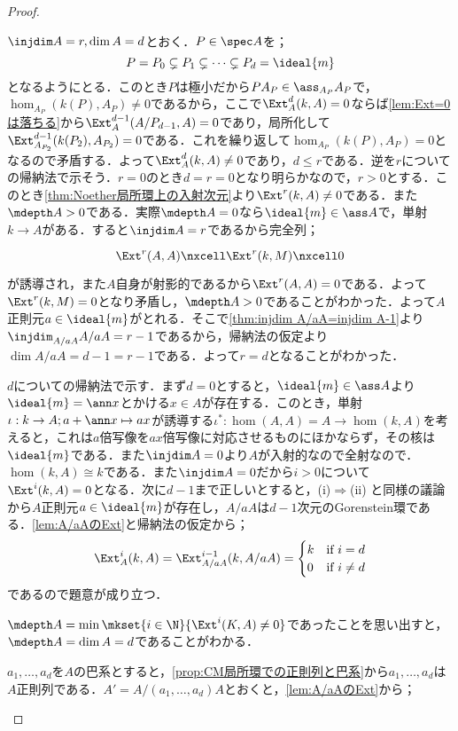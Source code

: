 \begin{proof}
	\begin{eqv}[7]
		\item 
		$\injdim A=r,\dim A=d$とおく．$P\in\spec A$を；
		\[P=P_0\subsetneq P_1\subsetneq\dots\subsetneq P_d=\ideal{m}\]
		となるようにとる．このとき$P$は極小だから$PA_P\in\ass_{A_P}A_P$で，$\hom_{A_P}(k(P),A_P)\neq0$であるから，ここで$\Ext^d_A(k,A)=0$ならば\ref{lem:Ext=0は落ちる}から$\Ext^{d-1}_A(A/P_{d-1},A)=0$であり，局所化して$\Ext^{d-1}_{A_{P_2}}(k(P_2),A_{P_2})=0$である．これを繰り返して$\hom_{A_P}(k(P),A_P)=0$となるので矛盾する．よって$\Ext^d_A(k,A)\neq0$であり，$d\leq r$である．逆を$r$についての帰納法で示そう．$r=0$のとき$d=r=0$となり明らかなので，$r>0$とする．このとき\ref{thm:Noether局所環上の入射次元}より$\Ext^r(k,A)\neq0$である．また$\mdepth A>0$である．実際$\mdepth A=0$なら$\ideal{m}\in\ass A$で，単射$k\to A$がある．すると$\injdim A=r$であるから完全列；
		\[\begin{tikzcd}
		\Ext^r(A,A)\nxcell\Ext^r(k,M)\nxcell0
		\end{tikzcd}\]
		が誘導され，また$A$自身が射影的であるから$\Ext^r(A,A)=0$である．よって$\Ext^r(k,M)=0$となり矛盾し，$\mdepth A>0$であることがわかった．よって$A$正則元$a\in\ideal{m}$がとれる．そこで\ref{thm:injdim A/aA=injdim A-1}より$\injdim_{A/aA}A/aA=r-1$であるから，帰納法の仮定より$\dim A/aA=d-1=r-1$である．よって$r=d$となることがわかった．
		\item $d$についての帰納法で示す．まず$d=0$とすると，$\ideal{m}\in\ass A$より$\ideal{m}=\ann x$とかける$x\in A$が存在する．このとき，単射$\iota:k\to A;a+\ann x\mapsto ax$が誘導する$\iota^\ast:\hom(A,A)=A\to\hom(k,A)$を考えると，これは$a$倍写像を$ax$倍写像に対応させるものにほかならず，その核は$\ideal{m}$である．また$\injdim A=0$より$A$が入射的なので全射なので．$\hom(k,A)\cong k$である．また$\injdim A=0$だから$i>0$について$\Ext^i(k,A)=0$となる．次に$d-1$まで正しいとすると，(i)$\Longrightarrow$(ii) と同様の議論から$A$正則元$a\in\ideal{m}$が存在し，$A/aA$は$d-1$次元のGorenstein環である．\ref{lem:A/aAのExt}と帰納法の仮定から；
		\[\Ext^i_A(k,A)=\Ext^{i-1}_{A/aA}(k,A/aA)=\begin{cases}
		k&\text{if}~i=d\\0&\text{if}~i\neq d
		\end{cases}\]
		であるので題意が成り立つ．
		\item $\mdepth A=\min\mkset{i\in\N}{\Ext^i(K,A)\neq0}$であったことを思い出すと，$\mdepth A=\dim A=d$であることがわかる．
		\item $a_1,\dots,a_d$を$A$の巴系とすると，\ref{prop:CM局所環での正則列と巴系}から$a_1,\dots,a_d$は$A$正則列である．$A'=A/(a_1,\dots,a_d)A$とおくと，\ref{lem:A/aAのExt}から；

\end{eqv}
\end{proof}
